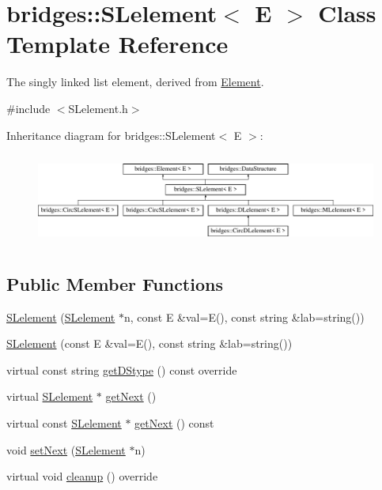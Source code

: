 \hypertarget{classbridges_1_1_s_lelement}{}\section{bridges\+:\+:S\+Lelement$<$ E $>$ Class Template Reference}
\label{classbridges_1_1_s_lelement}


The singly linked list element, derived from \mbox{\hyperlink{classbridges_1_1_element}{Element}}.  




{\ttfamily \#include $<$S\+Lelement.\+h$>$}

Inheritance diagram for bridges\+:\+:S\+Lelement$<$ E $>$\+:\begin{figure}[H]
\begin{center}
\leavevmode
\includegraphics[height=3.060109cm]{classbridges_1_1_s_lelement}
\end{center}
\end{figure}
\subsection*{Public Member Functions}
\begin{DoxyCompactItemize}
\item 
\mbox{\hyperlink{classbridges_1_1_s_lelement_a9ddac46a935b85cde76305135d16de0a}{S\+Lelement}} (\mbox{\hyperlink{classbridges_1_1_s_lelement}{S\+Lelement}} $\ast$n, const E \&val=E(), const string \&lab=string())
\item 
\mbox{\hyperlink{classbridges_1_1_s_lelement_a76423021747b1f2090847c418c13352b}{S\+Lelement}} (const E \&val=E(), const string \&lab=string())
\item 
virtual const string \mbox{\hyperlink{classbridges_1_1_s_lelement_a136330b3481a47b3edb429f323274655}{get\+D\+Stype}} () const override
\item 
virtual \mbox{\hyperlink{classbridges_1_1_s_lelement}{S\+Lelement}} $\ast$ \mbox{\hyperlink{classbridges_1_1_s_lelement_a5bd74108a9aa49339378bf62cdbb19ca}{get\+Next}} ()
\item 
virtual const \mbox{\hyperlink{classbridges_1_1_s_lelement}{S\+Lelement}} $\ast$ \mbox{\hyperlink{classbridges_1_1_s_lelement_a4422b7731a84734d312b8cd8e241b1e8}{get\+Next}} () const
\item 
void \mbox{\hyperlink{classbridges_1_1_s_lelement_a347f8809406f930ce83bf44764a4f1b5}{set\+Next}} (\mbox{\hyperlink{classbridges_1_1_s_lelement}{S\+Lelement}} $\ast$n)
\item 
virtual void \mbox{\hyperlink{classbridges_1_1_s_lelement_ac747648849874407e9d907bb4557dd52}{cleanup}} () override
\end{DoxyCompactItemize}
